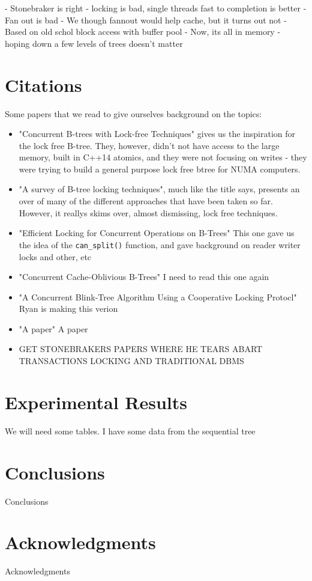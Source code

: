 \documentclass{sig-alternate}
\begin{document}
- Stonebraker is right - locking is bad, single threads fast to completion is better
- Fan out is bad
	- We though fannout would help cache, but it turns out not
	- Based on old schol block access with buffer pool
	- Now, its all in memory - hoping down a few levels of trees doesn't matter


\section{Citations}
Some papers that we read to give ourselves background on the topics:
\begin{itemize}
  \item "Concurrent B-trees with Lock-free Techniques"\cite{sultana:lockfree} gives us the inspiration for the lock free B-tree.  They, however, didn't not have access to the large memory, built in C++14 atomics, and they were not focusing on writes - they were trying to build a general purpose lock free btree for NUMA computers.
  \item "A survey of B-tree locking techniques"\cite{graefe:survey}, much like the title says, presents an over of many of the different approaches that have been taken so far.  However, it reallys skims over, almost dismissing, lock free techniques.
  \item "Efficient Locking for Concurrent Operations on B-Trees" \cite{lehman:locking} This one gave us the idea of the \texttt{can\_split()} function, and gave background on reader writer locks and other, etc
  \item "Concurrent Cache-Oblivious B-Trees" \cite{bender:cache} I need to read this one again
  \item "A Concurrent Blink-Tree Algorithm Using a Cooperative Locking Protocl" \cite{lim:blink} Ryan is making this verion
  \item "A paper" A paper
  \item GET STONEBRAKERS PAPERS WHERE HE TEARS ABART TRANSACTIONS LOCKING AND TRADITIONAL DBMS
\end{itemize}

\section{Experimental Results}
We will need some tables.  I have some data from the sequential tree

\section{Conclusions}
Conclusions

\section{Acknowledgments}
Acknowledgments



\end{document}

